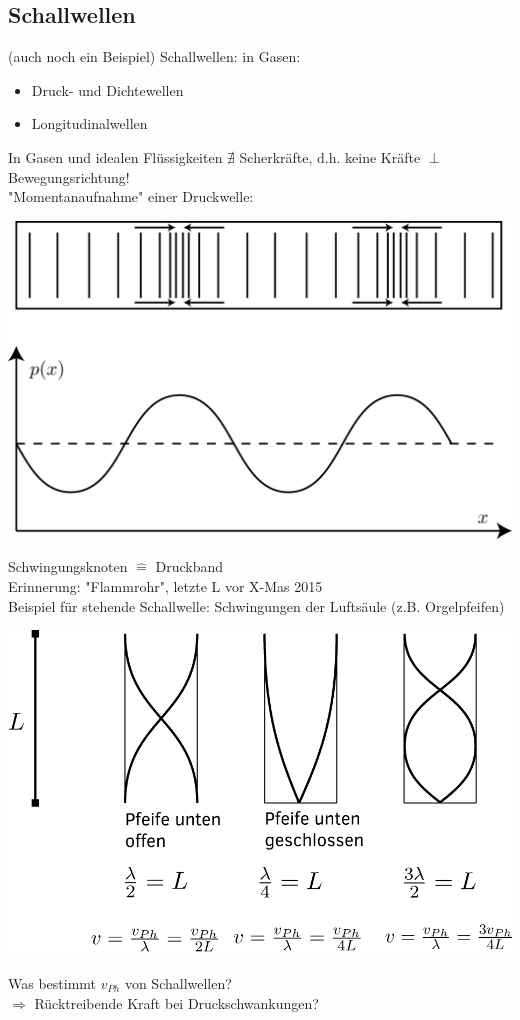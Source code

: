 \subsection{Schallwellen} (auch noch ein Beispiel)
Schallwellen: in Gasen:
\begin{itemize}
	\item Druck- und Dichtewellen
	\item Longitudinalwellen
\end{itemize}
In Gasen und idealen Flüssigkeiten $ \nexists $ Scherkräfte, d.h. keine Kräfte $ \perp $ Bewegungsrichtung!\\
"Momentanaufnahme" einer Druckwelle:
\begin{center}
	\includegraphics[width=0.7\linewidth]{skizzen/19/19B23}
\end{center}
Schwingungsknoten $ \hat{=} $ Druckband\\
Erinnerung: "Flammrohr", letzte L vor X-Mas 2015\\
Beispiel für stehende Schallwelle: Schwingungen der Luftsäule (z.B. Orgelpfeifen)
\begin{center}
	\includegraphics[width=0.7\linewidth]{skizzen/19/19B24}
\end{center}
Was bestimmt $ v_{Ph} $ von Schallwellen?\\
$ \Rightarrow $ Rücktreibende Kraft bei Druckschwankungen?\\
